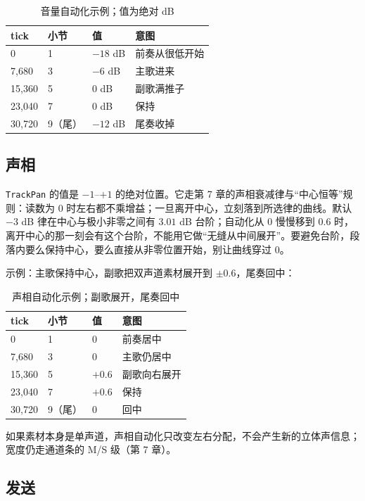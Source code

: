 \begin{table}[htbp]
\centering
\small
\begin{tabular}{@{}llll@{}}
\hline
tick & 小节 & 值 & 意图 \\
\hline
0 & 1 & $-18$ dB & 前奏从很低开始 \\
7{,}680 & 3 & $-6$ dB & 主歌进来 \\
15{,}360 & 5 & $0$ dB & 副歌满推子 \\
23{,}040 & 7 & $0$ dB & 保持 \\
30{,}720 & 9（尾） & $-12$ dB & 尾奏收掉 \\
\hline
\end{tabular}
\caption{音量自动化示例；值为绝对 dB}
\label{tab:automation-volume-recipe}
\end{table}

\subsection{声相}

\texttt{TrackPan} 的值是 $-1$–$+1$ 的绝对位置。它走第 7 章的声相衰减律与“中心恒等”规则：读数为 $0$ 时左右都不乘增益；一旦离开中心，立刻落到所选律的曲线。默认 $-3$ dB 律在中心与极小非零之间有 $3.01$ dB 台阶；自动化从 $0$ 慢慢移到 $0.6$ 时，离开中心的那一刻会有这个台阶，不能用它做“无缝从中间展开”。要避免台阶，段落内要么保持中心，要么直接从非零位置开始，别让曲线穿过 $0$。

示例：主歌保持中心，副歌把双声道素材展开到 $\pm0.6$，尾奏回中：

\begin{table}[htbp]
\centering
\small
\begin{tabular}{@{}llll@{}}
\hline
tick & 小节 & 值 & 意图 \\
\hline
0 & 1 & $0$ & 前奏居中 \\
7{,}680 & 3 & $0$ & 主歌仍居中 \\
15{,}360 & 5 & $+0.6$ & 副歌向右展开 \\
23{,}040 & 7 & $+0.6$ & 保持 \\
30{,}720 & 9（尾） & $0$ & 回中 \\
\hline
\end{tabular}
\caption{声相自动化示例；副歌展开，尾奏回中}
\label{tab:automation-pan-recipe}
\end{table}

如果素材本身是单声道，声相自动化只改变左右分配，不会产生新的立体声信息；宽度仍走通道条的 M/S 级（第 7 章）。

\subsection{发送}

